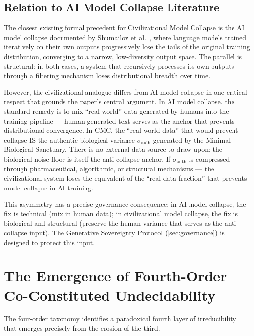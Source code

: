 \documentclass[11pt, a4paper]{article}
\theoremstyle{remark}
\begin{document}
\subsection{Relation to AI Model Collapse Literature}\label{sec:model-collapse-lit}

The closest existing formal precedent for Civilizational Model Collapse is the AI model collapse documented by Shumailov et al.~\cite{shumailov2024}, where language models trained iteratively on their own outputs progressively lose the tails of the original training distribution, converging to a narrow, low-diversity output space. The parallel is structural: in both cases, a system that recursively processes its own outputs through a filtering mechanism loses distributional breadth over time.

However, the civilizational analogue differs from AI model collapse in one critical respect that grounds the paper's central argument. In AI model collapse, the standard remedy is to mix ``real-world'' data generated by humans into the training pipeline --- human-generated text serves as the anchor that prevents distributional convergence. In CMC, the ``real-world data'' that would prevent collapse IS the authentic biological variance $\sigma_{\text{auth}}$ generated by the Minimal Biological Sanctuary. There is no external data source to draw upon; the biological noise floor is itself the anti-collapse anchor. If $\sigma_{\text{auth}}$ is compressed --- through pharmaceutical, algorithmic, or structural mechanisms --- the civilizational system loses the equivalent of the ``real data fraction'' that prevents model collapse in AI training.

This asymmetry has a precise governance consequence: in AI model collapse, the fix is technical (mix in human data); in civilizational model collapse, the fix is biological and structural (preserve the human variance that serves as the anti-collapse input). The Generative Sovereignty Protocol (\cref{sec:governance}) is designed to protect this input.

\section{The Emergence of Fourth-Order Co-Constituted Undecidability}\label{sec:fourth-order}

The four-order taxonomy identifies a paradoxical fourth layer of irreducibility that emerges precisely from the erosion of the third.
\end{document}
